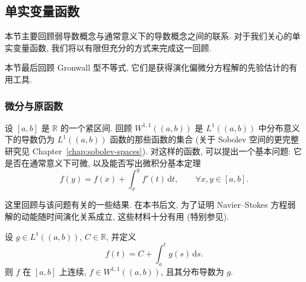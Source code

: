 \subsection{单实变量函数}
\label{sec:chap2-one-real-variable}
\renewcommand{\thestatement}{4.\number\numexpr\value{statement}-58\relax}

本节主要回顾弱导数概念与通常意义下的导数概念之间的联系. 对于我们关心的单实变量函数, 我们将以有限但充分的方式来完成这一回顾.

本节最后回顾 Gronwall 型不等式, 它们是获得演化偏微分方程解的先验估计的有用工具.

\subsubsection{微分与原函数}
\label{subsec:chap2-differentiation-antiderivatives}

设 $[a,b]$ 是 $\mathbb{R}$ 的一个紧区间. 回顾 $W^{1,1}((a,b))$ 是 $L^1((a,b))$ 中分布意义下的导数仍为 $L^1((a,b))$ 函数的那些函数的集合 (关于 Sobolev 空间的更完整研究见 Chapter~\ref{chap:sobolev-spaces}). 对这样的函数, 可以提出一个基本问题: 它是否在通常意义下可微, 以及能否写出微积分基本定理
\[
 f(y)=f(x)+\int_x^y f'(t)\,\mathrm{d}t,
 \qquad\forall x,y\in[a,b].
\]

这里回顾与该问题有关的一些结果. 在本书后文, 为了证明 Navier--Stokes 方程弱解的动能随时间演化关系成立, 这些材料十分有用 (特别参见).

\begin{Lemma}
\label{lem:chap2-integral-antiderivative}
设 $g\in L^1((a,b))$, $C\in\mathbb{R}$, 并定义
\[
 f(t)=C+\int_a^t g(s)\,\mathrm{d}s.
\]
则 $f$ 在 $[a,b]$ 上连续, $f\in W^{1,1}((a,b))$, 且其分布导数为 $g$.
\end{Lemma}

